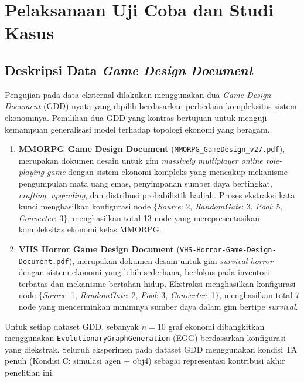 \section{Pelaksanaan Uji Coba dan Studi Kasus}

\subsection{Deskripsi Data \textit{Game Design Document}}

Pengujian pada data eksternal dilakukan menggunakan dua \textit{Game Design Document} (GDD) nyata yang dipilih berdasarkan perbedaan kompleksitas sistem ekonominya. Pemilihan dua GDD yang kontras bertujuan untuk menguji kemampuan generalisasi model terhadap topologi ekonomi yang beragam.

\begin{enumerate}
    \item \textbf{MMORPG Game Design Document} (\texttt{MMORPG\_GameDesign\_v27.pdf}), merupakan dokumen desain untuk gim \textit{massively multiplayer online role-playing game} dengan sistem ekonomi kompleks yang mencakup mekanisme pengumpulan mata uang emas, penyimpanan sumber daya bertingkat, \textit{crafting}, \textit{upgrading}, dan distribusi probabilistik hadiah. Proses ekstraksi kata kunci menghasilkan konfigurasi node $\{$\textit{Source}: 2, \textit{RandomGate}: 3, \textit{Pool}: 5, \textit{Converter}: 3$\}$, menghasilkan total 13 node yang merepresentasikan kompleksitas ekonomi kelas MMORPG.

    \item \textbf{VHS Horror Game Design Document} (\texttt{VHS-Horror-Game-Design-Document.pdf}), merupakan dokumen desain untuk gim \textit{survival horror} dengan sistem ekonomi yang lebih sederhana, berfokus pada inventori terbatas dan mekanisme bertahan hidup. Ekstraksi menghasilkan konfigurasi node $\{$\textit{Source}: 1, \textit{RandomGate}: 2, \textit{Pool}: 3, \textit{Converter}: 1$\}$, menghasilkan total 7 node yang mencerminkan minimnya sumber daya dalam gim bertipe \textit{survival}.
\end{enumerate}

Untuk setiap dataset GDD, sebanyak $n = 10$ graf ekonomi dibangkitkan menggunakan \texttt{EvolutionaryGraphGeneration} (EGG) berdasarkan konfigurasi yang diekstrak. Seluruh eksperimen pada dataset GDD menggunakan kondisi TA penuh (Kondisi C: simulasi agen + obj4) sebagai representasi kontribusi akhir penelitian ini.

